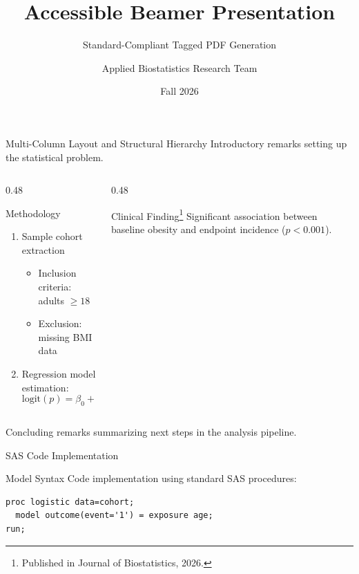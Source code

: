 \documentclass[14pt,t,lang=en-US]{beamer-accessibility}
\title{Accessible Beamer Presentation}
\subtitle{Standard-Compliant Tagged PDF Generation}
\author{Applied Biostatistics Research Team}
\date{Fall 2026}
\begin{document}
\begin{frame}
\titlepage
\end{frame}

\begin{frame}{Multi-Column Layout and Structural Hierarchy}
Introductory remarks setting up the statistical problem.

\begin{columns}[T]
\begin{column}{0.48\textwidth}
\begin{block}{Methodology}
\begin{enumerate}
\item Sample cohort extraction
  \begin{itemize}
  \item Inclusion criteria: adults $\ge 18$
  \item Exclusion: missing BMI data
  \end{itemize}
\item Regression model estimation:
  \[
  \mathrm{logit}(p) = \beta_0 + \beta_1 X
  \]
\end{enumerate}
\end{block}
\end{column}

\begin{column}{0.48\textwidth}
\begin{alertblock}{Clinical Finding\footnote{Published in Journal of Biostatistics, 2026.}}
Significant association between baseline obesity and endpoint incidence ($p < 0.001$).
\end{alertblock}
\end{column}
\end{columns}

Concluding remarks summarizing next steps in the analysis pipeline.
\end{frame}

\begin{frame}[fragile]{SAS Code Implementation}
\begin{block}{Model Syntax}
Code implementation using standard SAS procedures:
\begin{lstlisting}[basicstyle=\ttfamily\small]
proc logistic data=cohort;
  model outcome(event='1') = exposure age;
run;
\end{lstlisting}
\end{block}
\end{frame}
\end{document}
